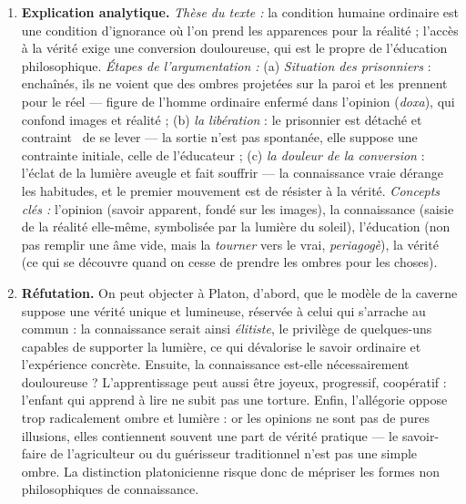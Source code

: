 \documentclass[11pt]{article}
\newcommand{\cle}[1]{{\popxbold\color{popdark}#1}}
\begin{document}
\begin{corrige}
\begin{enumerate}
\item \textbf{Explication analytique.} \emph{Thèse du texte :} la condition humaine ordinaire est une condition d'ignorance où l'on prend les apparences pour la réalité ; l'accès à la vérité exige une conversion douloureuse, qui est le propre de l'éducation philosophique. \emph{Étapes de l'argumentation :} (a) \emph{Situation des prisonniers} : enchaînés, ils ne voient que des ombres projetées sur la paroi et les prennent pour le réel --- figure de l'homme ordinaire enfermé dans l'\cle{opinion} (\emph{doxa}), qui confond images et réalité ; (b) \emph{la libération} : le prisonnier est \guillemotleft détaché et contraint \guillemotright\ de se lever --- la sortie n'est pas spontanée, elle suppose une contrainte initiale, celle de l'éducateur ; (c) \emph{la douleur de la conversion} : l'éclat de la lumière aveugle et fait souffrir --- la \cle{connaissance} vraie dérange les habitudes, et le premier mouvement est de résister à la vérité. \emph{Concepts clés :} l'opinion (savoir apparent, fondé sur les images), la connaissance (saisie de la réalité elle-même, symbolisée par la lumière du soleil), l'éducation (non pas remplir une âme vide, mais la \emph{tourner} vers le vrai, \emph{periagogè}), la vérité (ce qui se découvre quand on cesse de prendre les ombres pour les choses).
\item \textbf{Réfutation.} On peut objecter à Platon, d'abord, que le modèle de la caverne suppose une vérité unique et lumineuse, réservée à celui qui s'arrache au commun : la connaissance serait ainsi \emph{élitiste}, le privilège de quelques-uns capables de supporter la lumière, ce qui dévalorise le savoir ordinaire et l'expérience concrète. Ensuite, la connaissance est-elle nécessairement douloureuse ? L'apprentissage peut aussi être joyeux, progressif, coopératif : l'enfant qui apprend à lire ne subit pas une torture. Enfin, l'allégorie oppose trop radicalement ombre et lumière : or les opinions ne sont pas de pures illusions, elles contiennent souvent une part de vérité pratique --- le savoir-faire de l'agriculteur ou du guérisseur traditionnel n'est pas une simple ombre. La distinction platonicienne risque donc de mépriser les formes non philosophiques de connaissance.

\end{enumerate}
\end{corrige}
\end{document}
